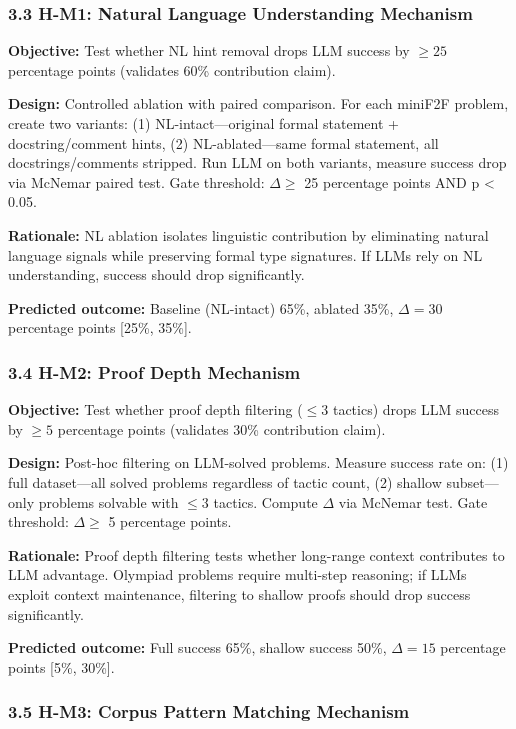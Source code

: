 \subsubsection{3.3 H-M1: Natural Language Understanding Mechanism}

\textbf{Objective:} Test whether NL hint removal drops LLM success by $\geq 25$ percentage points (validates 60\% contribution claim).

\textbf{Design:} Controlled ablation with paired comparison. For each miniF2F problem, create two variants: (1) NL-intact---original formal statement + docstring/comment hints, (2) NL-ablated---same formal statement, all docstrings/comments stripped. Run LLM on both variants, measure success drop via McNemar paired test. Gate threshold: $\Delta \geq$ 25 percentage points AND p < 0.05.

\textbf{Rationale:} NL ablation isolates linguistic contribution by eliminating natural language signals while preserving formal type signatures. If LLMs rely on NL understanding, success should drop significantly.

\textbf{Predicted outcome:} Baseline (NL-intact) 65\%, ablated 35\%, $\Delta =30$ percentage points [25\%, 35\%].

\subsubsection{3.4 H-M2: Proof Depth Mechanism}

\textbf{Objective:} Test whether proof depth filtering ($\leq 3$ tactics) drops LLM success by $\geq 5$ percentage points (validates 30\% contribution claim).

\textbf{Design:} Post-hoc filtering on LLM-solved problems. Measure success rate on: (1) full dataset---all solved problems regardless of tactic count, (2) shallow subset---only problems solvable with $\leq 3$ tactics. Compute $\Delta$ via McNemar test. Gate threshold: $\Delta \geq$ 5 percentage points.

\textbf{Rationale:} Proof depth filtering tests whether long-range context contributes to LLM advantage. Olympiad problems require multi-step reasoning; if LLMs exploit context maintenance, filtering to shallow proofs should drop success significantly.

\textbf{Predicted outcome:} Full success 65\%, shallow success 50\%, $\Delta =15$ percentage points [5\%, 30\%].

\subsubsection{3.5 H-M3: Corpus Pattern Matching Mechanism}

